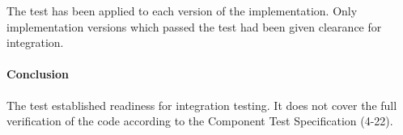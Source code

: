 The test has been applied to each version of the
implementation. Only implementation versions which passed the test had
been given clearance for integration.






\paragraph{Conclusion}

The test established readiness for integration testing. It does not
cover the full
verification of the code according to the Component Test Specification
(4-22). 